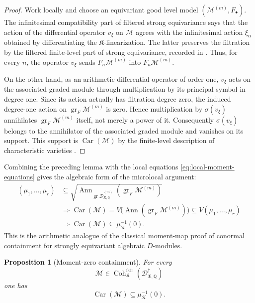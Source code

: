 \documentclass[11pt]{amsart}
\theoremstyle{plain}
\newtheorem{proposition}{Proposition}[section]
\theoremstyle{definition}
\theoremstyle{remark}
\newcommand{\Coh}{\operatorname{Coh}}
\newcommand{\Car}{\operatorname{Car}}
\newcommand{\gr}{\operatorname{gr}}
\newcommand{\fstr}{\mathrm{fstr}}
\begin{document}
\begin{proof}
Work locally and choose an equivariant good level model
\((\mathcal M^{(m)},F_\bullet)\).  The infinitesimal compatibility part of
filtered strong equivariance says that the action of the differential operator
\(v_\xi\) on \(\mathcal M\) agrees with the infinitesimal action
\(\xi_\alpha\) obtained by differentiating the
\(\mathfrak K\)-linearization.  The latter preserves the filtration by the filtered finite-level part of
strong equivariance, recorded in .  Thus, for
every \(n\), the operator \(v_\xi\) sends \(F_n\mathcal M^{(m)}\) into
\(F_n\mathcal M^{(m)}\).

On the other hand, as an arithmetic differential operator of order one,
\(v_\xi\) acts on the associated graded module through multiplication by its
principal symbol in degree one.  Since its action actually has filtration
degree zero, the induced degree-one action on
\(\gr_F\mathcal M^{(m)}\) is zero.  Hence multiplication by
\(\sigma(v_\xi)\) annihilates \(\gr_F\mathcal M^{(m)}\) itself, not merely a
power of it. Consequently \(\sigma(v_\xi)\) belongs to the annihilator of the
associated graded module and vanishes on its support. This support is
\(\Car(\mathcal M)\) by the finite-level description of characteristic
varieties \cite[5.3.2--5.3.4]{BerthelotIntro}.
\end{proof}

Combining the preceding lemma with the local equations
\eqref{eq:local-moment-equations} gives the algebraic form of the
microlocal argument:
\begin{equation}
\label{eq:annihilator-moment-chain}
\begin{aligned}
  (\mu_1,\ldots,\mu_r)
  &\subseteq
  \sqrt{\operatorname{Ann}_{\gr\widehat{\mathscr D}^{(m)}_{
  \mathfrak X,\mathbb Q}}
  (\gr_F\mathcal M^{(m)})} \\
  &\Longrightarrow
  \Car(\mathcal M)
  =V\bigl(\operatorname{Ann}(\gr_F\mathcal M^{(m)})\bigr)
  \subseteq V(\mu_1,\ldots,\mu_r) \\
  &\Longrightarrow
  \Car(\mathcal M)\subseteq\mu_{\mathcal K}^{-1}(0).
\end{aligned}
\end{equation}
This is the arithmetic analogue of the classical moment-map proof of
conormal containment for strongly equivariant algebraic \(D\)-modules.

\begin{proposition}[Moment-zero containment]
\label{prop:moment-zero-containment}
For every
\[
  \mathcal M\in
  \Coh^{\fstr}_{\mathfrak K}
  (\mathscr D^\dagger_{\mathfrak X,\mathbb Q})
\]
one has
\[
  \Car(\mathcal M)\subseteq \mu_{\mathcal K}^{-1}(0).
\]
\end{proposition}
\end{document}
